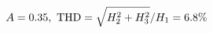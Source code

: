 \documentclass[preview]{standalone}
\begin{document}
\begin{align*}
\special{dvisvgm:raw <g id='unique000'>}A=0.35,\ \text{THD}=\sqrt{H_2^2+H_3^2}/H_1=6.8\%\special{dvisvgm:raw </g>}
\end{align*}
\end{document}
